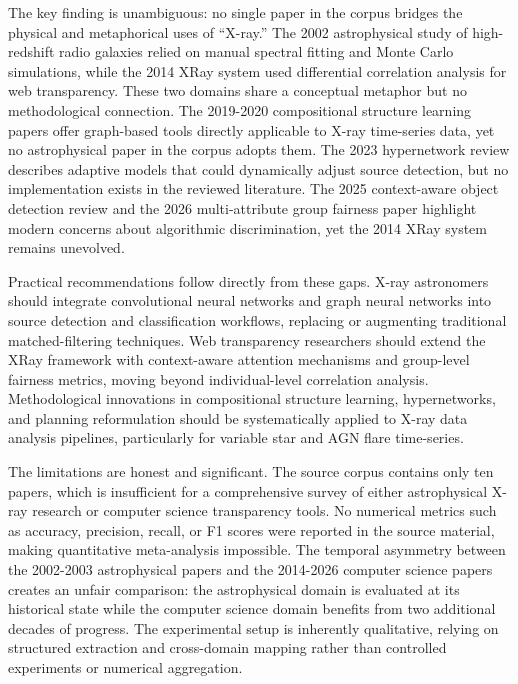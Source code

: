 \documentclass[conference]{IEEEtran}
\begin{document}
The key finding is unambiguous: no single paper in the corpus bridges the physical and metaphorical uses of ``X-ray.'' The 2002 astrophysical study of high-redshift radio galaxies \cite{r1} relied on manual spectral fitting and Monte Carlo simulations, while the 2014 XRay system \cite{r3} used differential correlation analysis for web transparency. These two domains share a conceptual metaphor but no methodological connection. The 2019-2020 compositional structure learning papers \cite{r4,r5} offer graph-based tools directly applicable to X-ray time-series data, yet no astrophysical paper in the corpus adopts them. The 2023 hypernetwork review \cite{r7} describes adaptive models that could dynamically adjust source detection, but no implementation exists in the reviewed literature. The 2025 context-aware object detection review \cite{r9} and the 2026 multi-attribute group fairness paper \cite{r10} highlight modern concerns about algorithmic discrimination, yet the 2014 XRay system remains unevolved.

Practical recommendations follow directly from these gaps. X-ray astronomers should integrate convolutional neural networks and graph neural networks into source detection and classification workflows, replacing or augmenting traditional matched-filtering techniques. Web transparency researchers should extend the XRay framework with context-aware attention mechanisms and group-level fairness metrics, moving beyond individual-level correlation analysis. Methodological innovations in compositional structure learning, hypernetworks, and planning reformulation should be systematically applied to X-ray data analysis pipelines, particularly for variable star and AGN flare time-series.

The limitations are honest and significant. The source corpus contains only ten papers, which is insufficient for a comprehensive survey of either astrophysical X-ray research or computer science transparency tools. No numerical metrics such as accuracy, precision, recall, or F1 scores were reported in the source material, making quantitative meta-analysis impossible. The temporal asymmetry between the 2002-2003 astrophysical papers and the 2014-2026 computer science papers creates an unfair comparison: the astrophysical domain is evaluated at its historical state while the computer science domain benefits from two additional decades of progress. The experimental setup is inherently qualitative, relying on structured extraction and cross-domain mapping rather than controlled experiments or numerical aggregation.
\end{document}
